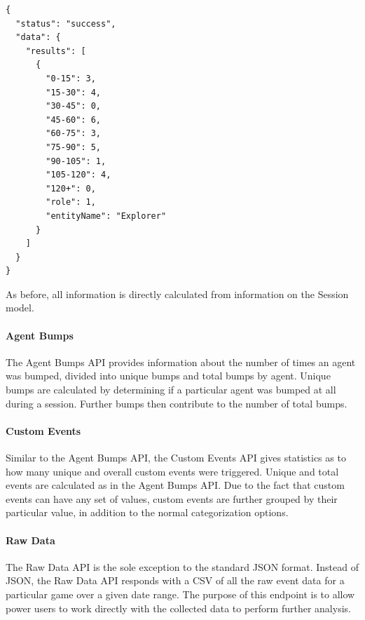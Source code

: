 \medskip
\begin{lstlisting}[caption={[Gameplay Duration API Response Example]Gameplay Duration API response{,} showing the number of sessions that fell within certain ranges of gameplay time{,} categorized by the Explorer role}, label={lst:duration_response}]
{
  "status": "success",
  "data": {
    "results": [
      {
        "0-15": 3,
        "15-30": 4,
        "30-45": 0,
        "45-60": 6,
        "60-75": 3,
        "75-90": 5,
        "90-105": 1,
        "105-120": 4,
        "120+": 0,
        "role": 1,
        "entityName": "Explorer"
      }
    ]
  }
}
\end{lstlisting}

As before, all information is directly calculated from information on the Session model.

\paragraph{Agent Bumps}

The Agent Bumps API provides information about the number of times an agent was bumped, divided into unique bumps and total bumps by agent. Unique bumps are calculated by determining if a particular agent was bumped at all during a session. Further bumps then contribute to the number of total bumps. 

\paragraph{Custom Events}

Similar to the Agent Bumps API, the Custom Events API gives statistics as to how many unique and overall custom events were triggered. Unique and total events are calculated as in the Agent Bumps API. Due to the fact that custom events can have any set of values, custom events are further grouped by their particular value, in addition to the normal categorization options.

\paragraph{Raw Data}

The Raw Data API is the sole exception to the standard JSON format. Instead of JSON, the Raw Data API responds with a CSV of all the raw event data for a particular game over a given date range. The purpose of this endpoint is to allow power users to work directly with the collected data to perform further analysis.


